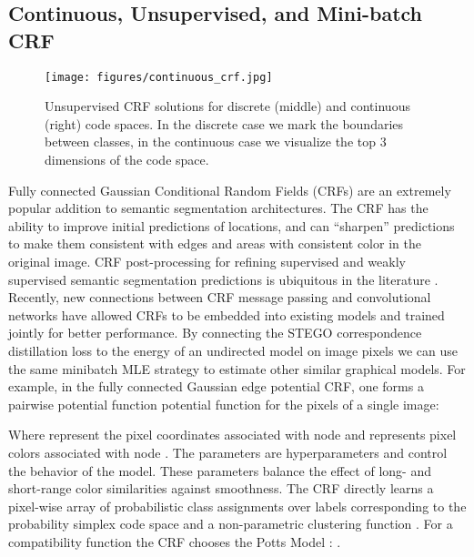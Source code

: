 \documentclass{article} \usepackage{iclr2022_conference,times}
\begin{document}
\subsection{Continuous, Unsupervised, and Mini-batch CRF}
\label{sec:crf}

\begin{figure}[h]
    \centering
    \texttt{[image: figures/continuous\_crf.jpg]}
    \caption{Unsupervised CRF solutions for discrete (middle) and continuous (right) code spaces. In the discrete case we mark the boundaries between classes, in the continuous case we visualize the top 3 dimensions of the code space.}
    \label{fig:crf}
\end{figure}

Fully connected Gaussian Conditional Random Fields (CRFs) \citep{crf} are an extremely popular addition to semantic segmentation architectures. The CRF has the ability to improve initial predictions of locations, and can ``sharpen'' predictions to make them consistent with edges and areas with consistent color in the original image. CRF post-processing for refining supervised and weakly supervised semantic segmentation predictions is ubiquitous in the literature \citep{crf,chen2014semantic,long2015fully,liu2020leveraging,interpixel}. Recently, new connections between CRF message passing and convolutional networks have allowed CRFs to be embedded into existing models \citep{chen2017rethinking,teichmann2018convolutional} and trained jointly for better performance. By connecting the STEGO correspondence distillation loss to the energy of an undirected model on image pixels we can use the same minibatch MLE strategy to estimate other similar graphical models. For example, in the fully connected Gaussian edge potential CRF, one forms a pairwise potential function potential function for the pixels of a single image:



Where  represent the pixel coordinates associated with node  and  represents pixel colors associated with node . The parameters  are hyperparameters and control the behavior of the model. These parameters balance the effect of long- and short-range color similarities against smoothness. The CRF directly learns a pixel-wise array of probabilistic class assignments over  labels corresponding to the probability simplex code space  and a non-parametric clustering function . For a compatibility function  the CRF chooses the Potts Model \citep{potts1952some}: . 
\end{document}
